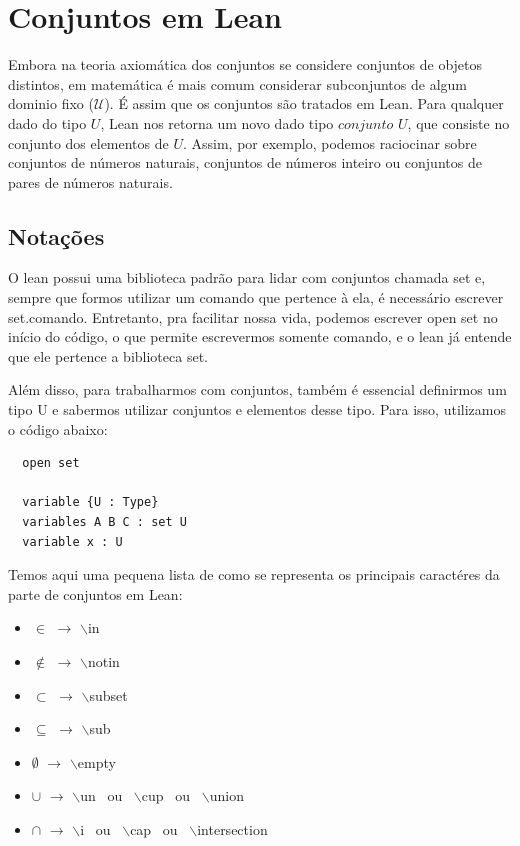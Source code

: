 \section{Conjuntos em Lean}
Embora na teoria axiomática dos conjuntos se considere conjuntos de objetos distintos, em matemática é mais comum considerar subconjuntos de algum dominio fixo ($\mathcal U $). É assim que os conjuntos são tratados em Lean. Para qualquer dado do tipo $U$, Lean nos retorna um novo dado tipo $conjunto$ $U$, que consiste no conjunto dos elementos de $U$. Assim, por exemplo, podemos raciocinar sobre conjuntos de números naturais, conjuntos de números inteiro ou conjuntos de pares de números naturais.

  \subsection{Notações}
  O lean possui uma biblioteca padrão para lidar com conjuntos chamada set e, sempre que formos utilizar um comando que pertence à ela, é necessário escrever {\selectfont set.comando}. Entretanto, pra facilitar nossa vida, podemos escrever {\selectfont open set} no início do código, o que permite escrevermos somente {\selectfont comando}, e o lean já entende que ele pertence a biblioteca set.

  Além disso, para trabalharmos com conjuntos, também é essencial definirmos um tipo {\selectfont U} e sabermos utilizar conjuntos e elementos desse tipo. Para isso, utilizamos o código abaixo:

  \begin{lstlisting}
  open set

  variable {U : Type}
  variables A B C : set U
  variable x : U \end{lstlisting}

  Temos aqui uma pequena lista de como se representa os principais caractéres da parte de conjuntos em Lean:

  \begin{itemize}
      \item $\in$ $\rightarrow$ $\backslash$in

      \item $\notin$ $\rightarrow$ $\backslash$notin

      \item $\subset$ $\rightarrow$ $\backslash$subset

      \item $\subseteq$ $\rightarrow$ $\backslash$sub

      \item $\emptyset$ $\rightarrow$ $\backslash$empty

      \item $\cup$ $\rightarrow$ $\backslash$un \ ou \ $\backslash$cup \ ou \ $\backslash$union

      \item $\cap$ $\rightarrow$ $\backslash$i \ ou \ $\backslash$cap \ ou \ $\backslash$intersection
  \end{itemize}

